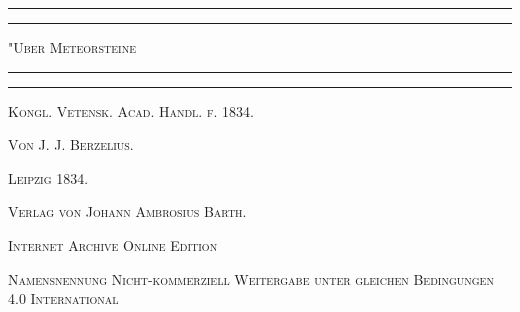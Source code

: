 \documentclass[a4paper, 11pt, oneside]{article}
\begin{document}
\begin{titlepage} %
	\centering %

	
	\rule{\textwidth}{1.6pt}\vspace*{-\baselineskip}\vspace*{2pt} %
	\rule{\textwidth}{0.4pt} %
	
	\vspace{1\baselineskip} %
	
	{\scshape\LARGE "Uber Meteorsteine\\[1.25pt]}
	
	\vspace{1\baselineskip} %

	\rule{\textwidth}{0.4pt}\vspace*{-\baselineskip}\vspace{3.2pt} %
	\rule{\textwidth}{1.6pt} %
	
	\vspace{1\baselineskip} %
	
	
	{\scshape Kongl. Vetensk. Acad. Handl. f. 1834.} %
	
	\vspace*{1\baselineskip} %
	
    {\scshape\small Von J. J. Berzelius.} %
    
    \vspace*{\fill}

	\vspace{1\baselineskip}

	{\small\scshape Leipzig 1834.}
	
	{\small\scshape{Verlag von Johann Ambrosius Barth.}}
	
	\vspace{0.5\baselineskip} %

    \scshape Internet Archive Online Edition  %
	
	{\scshape\small Namensnennung Nicht-kommerziell Weitergabe unter gleichen Bedingungen 4.0 International} %
\end{titlepage}
\setlength{\parskip}{1mm plus1mm minus1mm}
\clearpage
\tableofcontents
\clearpage
\end{document}

